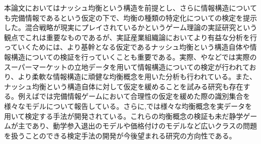 本論文においてはナッシュ均衡という構造を前提とし、さらに情報構造についても完備情報であるという仮定の下で、均衡の種類の特定化についての検定を提示した。混合戦略が現実にプレイされているかというゲーム理論の実証研究という観点でこれは重要なものであるが、実証産業組織論においてより有益な分析を行っていくためには、より基幹となる仮定であるナッシュ均衡という構造自体や情報構造についての検証を行っていくことも重要である。実際、\cite{Grieco2014a}や\cite{Magnolfi2015}などでは実際のスーパーマーケットの立地データを用いて情報構造についての検定が行われており、より柔軟な情報構造に頑健な均衡概念を用いた分析も行われている。また、ナッシュ均衡という構造自体に対して仮定を緩めることを試みる研究も存在する。例えば\cite{Aradillas-Lopez2008}では完備情報ゲームにおいて合理性の仮定を緩めた際の識別集合を様々なモデルについて報告している。さらに\cite{Kashaev2017},\cite{Kashaev2016}では様々な均衡概念を実データを用いて検定する手法が開発されている。これらの均衡概念の検証も未だ静学ゲームが主であり、動学参入退出のモデルや価格付けのモデルなど広いクラスの問題を扱うことのできる検定手法の開発が今後望まれる研究の方向性である。
